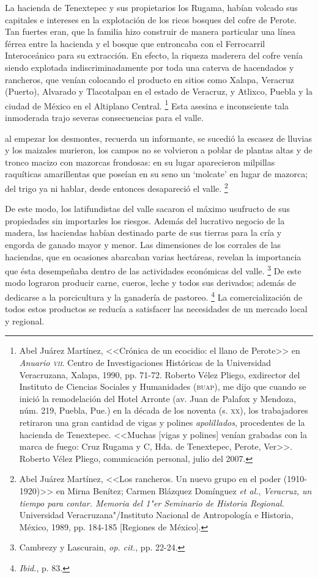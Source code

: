 \documentclass[14pt,twoside,final]{extbook} %
\let\oldfootnote\footnote
\renewcommand\footnote[1]{%
\oldfootnote{\hspace{1mm}#1}}
\begin{document}
La hacienda de Tenextepec y sus propietarios los Rugama, habían volcado sus capitales e intereses en la explotación de los ricos bosques del cofre de Perote. Tan fuertes eran, que la familia hizo construir de manera particular una línea férrea entre la hacienda y el bosque que entroncaba con el Ferrocarril Interoceánico para su extracción. En efecto, la riqueza maderera del cofre venía siendo explotada indiscriminadamente por toda una caterva de hacendados y rancheros, que venían colocando el producto en sitios como Xalapa, Veracruz (Puerto), Alvarado y Tlacotalpan en el estado de Veracruz,
y Atlixco, Puebla y la ciudad de México en el Altiplano Central.\footnote{Abel Juárez Martínez, <<Crónica de un ecocidio: el llano de Perote>> en \textit{Anuario \textsc{vii}}. Centro de Investigaciones Históricas de la Universidad Veracruzana, Xalapa, 1990, pp. 71-72. Roberto Vélez Pliego, exdirector del Instituto de Ciencias Sociales y Humanidades (\textsc{buap}), me dijo que cuando se inició la remodelación del Hotel Arronte (av. Juan de Palafox y Mendoza, núm. 219, Puebla, Pue.) en la década de los noventa (s. \textsc{xx}), los trabajadores retiraron una gran cantidad de vigas y polines \emph{apolillados}, procedentes de la hacienda de Tenextepec. <<Muchas [vigas y polines] venían grabadas con la marca de fuego: Cruz Rugama y C\textsu{ia}, Hda. de Tenextepec, Perote, Ver>>. Roberto Vélez Pliego, comunicación personal, julio del 2007.} Esta asesina e inconsciente tala inmoderada trajo severas consecuencias para el valle.
\begin{quoting}
al empezar los desmontes, recuerda un informante, se sucedió la escasez de lluvias y los maizales murieron, los campos no se volvieron a poblar de plantas altas y de tronco macizo con mazorcas frondosas: en su lugar aparecieron milpillas raquíticas amarillentas que poseían en su seno un
`molcate' en lugar de mazorca; del trigo ya ni hablar, desde entonces desapareció el valle.\footnote{Abel Juárez Martínez, <<Los rancheros. Un nuevo grupo en el poder (1910-1920)>> en Mirna Benítez; Carmen Blázquez Domínguez \emph{et al.}, \emph{Veracruz, un tiempo para contar. Memoria del 1"er Seminario de Historia Regional}. Universidad Veracruzana"/Instituto Nacional de Antropología e Historia, México, 1989, pp. 184-185 [Regiones de México].}
\end{quoting}
De este modo, los latifundistas del valle sacaron el máximo usufructo de sus propiedades sin importarles los riesgos. Además del lucrativo negocio de la madera, las haciendas habían destinado parte de sus tierras para la cría y engorda de ganado mayor y menor. Las dimensiones de los corrales de las haciendas, que en ocasiones abarcaban varias hectáreas, revelan la importancia que ésta desempeñaba dentro de las actividades económicas del valle.\footnote{Cambrezy y Lascurain, \emph{op. cit.}, pp. 22-24.} De este modo lograron producir carne, cueros, leche y todos sus derivados; además de dedicarse a la porcicultura y la ganadería de pastoreo.\footnote{\emph{Ibid.}, p. 83.} La comercialización de todos estos productos se reducía a satisfacer las necesidades de un mercado local y regional.
\end{document}
